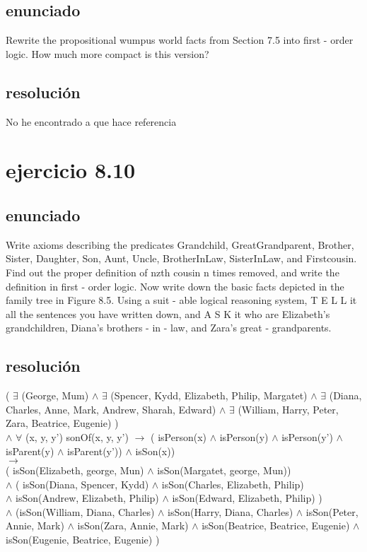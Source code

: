 \documentclass[a4paper,10pt]{article}
\begin{document}
\subsection{enunciado}
Rewrite the propositional wumpus world facts from Section 7.5 into first - order logic. How much more compact is this version?
\subsection{resolución}
No he encontrado a que hace referencia

\section{ejercicio 8.10}
\subsection{enunciado}
Write axioms  describing  the  predicates Grandchild, GreatGrandparent, Brother, Sister, Daughter, Son,  Aunt, Uncle, BrotherInLaw, SisterInLaw, and Firstcousin. Find  out  the  proper  definition of nzth cousin n times  removed,  and  write  the  definition in first - order logic. Now write down the basic facts depicted in the family tree in Figure 8.5. Using a suit - able logical  reasoning  system, T E L L it all the  sentences you have written down,  and A S K it who are Elizabeth's  grandchildren, Diana's  brothers - in - law, and Zara's  great - grandparents.
\subsection{resolución}
( $\exists$ (George, Mum)
$\land$ $\exists$ (Spencer, Kydd, Elizabeth, Philip, Margatet)
$\land$ $\exists$ (Diana, Charles, Anne, Mark, Andrew, Sharah, Edward)
$\land$ $\exists$ (William, Harry, Peter, Zara, Beatrice, Eugenie) )\\
$\land$ $\forall$ (x, y, y') sonOf(x, y, y') $\rightarrow$ ( isPerson(x) $\land$ isPerson(y) $\land$ isPerson(y') $\land$ isParent(y) $\land$ isParent(y')) $\land$ isSon(x))\\
$\rightarrow$\\
( isSon(Elizabeth, george, Mun) $\land$ isSon(Margatet, george, Mun))\\
$\land$
( isSon(Diana, Spencer, Kydd) $\land$ isSon(Charles, Elizabeth, Philip)\\ $\land$ isSon(Andrew, Elizabeth, Philip) $\land$ isSon(Edward, Elizabeth, Philip) )\\
$\land$ (isSon(William, Diana, Charles) $\land$ isSon(Harry, Diana, Charles) $\land$ isSon(Peter, Annie, Mark) $\land$ isSon(Zara, Annie, Mark) $\land$ isSon(Beatrice, Beatrice, Eugenie) $\land$ isSon(Eugenie, Beatrice, Eugenie) )
\end{document}
